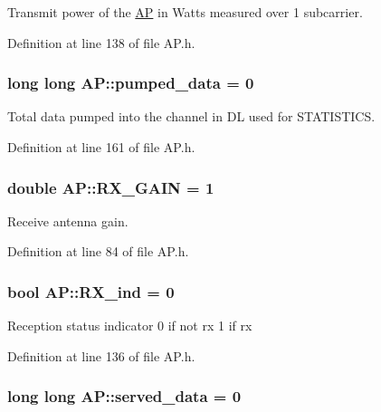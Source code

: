 Transmit power of the \hyperlink{classAP}{A\-P} in Watts measured over 1 subcarrier. 



Definition at line 138 of file A\-P.\-h.

\hypertarget{classAP_ae7f2e09d8692bea041bbc7ff00521795}{
\subsubsection[{pumped\-\_\-data}]{\setlength{\rightskip}{0pt plus 5cm}long long A\-P\-::pumped\-\_\-data = 0}}\label{classAP_ae7f2e09d8692bea041bbc7ff00521795}


Total data pumped into the channel in D\-L used for S\-T\-A\-T\-I\-S\-T\-I\-C\-S. 



Definition at line 161 of file A\-P.\-h.

\hypertarget{classAP_ab6036cf0065beea6c6129d086ceb5ad5}{
\subsubsection[{R\-X\-\_\-\-G\-A\-I\-N}]{\setlength{\rightskip}{0pt plus 5cm}double A\-P\-::\-R\-X\-\_\-\-G\-A\-I\-N = 1\hspace{0.3cm}{\ttfamily [private]}}}\label{classAP_ab6036cf0065beea6c6129d086ceb5ad5}


Receive antenna gain. 



Definition at line 84 of file A\-P.\-h.

\hypertarget{classAP_af5b1c2bc10a9ce9f3007bbf37f95f144}{
\subsubsection[{R\-X\-\_\-ind}]{\setlength{\rightskip}{0pt plus 5cm}bool A\-P\-::\-R\-X\-\_\-ind = 0}}\label{classAP_af5b1c2bc10a9ce9f3007bbf37f95f144}
Reception status indicator 0 if not rx 1 if rx 

Definition at line 136 of file A\-P.\-h.

\hypertarget{classAP_a623295f5718f46c234a8ae496f1ff65d}{
\subsubsection[{served\-\_\-data}]{\setlength{\rightskip}{0pt plus 5cm}long long A\-P\-::served\-\_\-data = 0}}\label{classAP_a623295f5718f46c234a8ae496f1ff65d}


